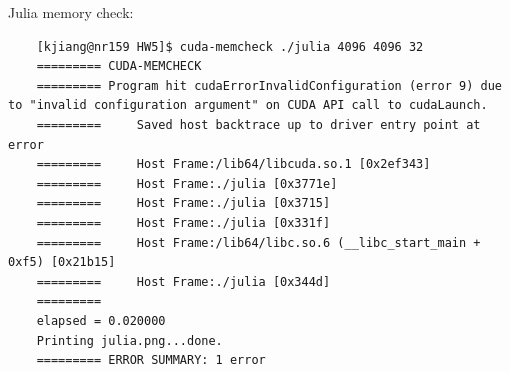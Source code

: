 \documentclass{article}
\begin{document}
Julia memory check:
\begin{verbatim}
    [kjiang@nr159 HW5]$ cuda-memcheck ./julia 4096 4096 32
    ========= CUDA-MEMCHECK
    ========= Program hit cudaErrorInvalidConfiguration (error 9) due to "invalid configuration argument" on CUDA API call to cudaLaunch. 
    =========     Saved host backtrace up to driver entry point at error
    =========     Host Frame:/lib64/libcuda.so.1 [0x2ef343]
    =========     Host Frame:./julia [0x3771e]
    =========     Host Frame:./julia [0x3715]
    =========     Host Frame:./julia [0x331f]
    =========     Host Frame:/lib64/libc.so.6 (__libc_start_main + 0xf5) [0x21b15]
    =========     Host Frame:./julia [0x344d]
    =========
    elapsed = 0.020000
    Printing julia.png...done.
    ========= ERROR SUMMARY: 1 error
\end{verbatim}



\end{document}

